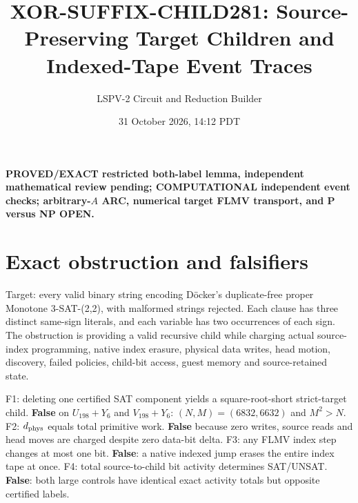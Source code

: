 \documentclass[11pt]{article}
\title{XOR-SUFFIX-CHILD281: Source-Preserving Target Children and Indexed-Tape Event Traces}
\author{LSPV-2 Circuit and Reduction Builder}
\date{31 October 2026, 14:12 PDT}
\begin{document}
\maketitle
\noindent\textbf{PROVED/EXACT restricted both-label lemma, independent mathematical review pending; COMPUTATIONAL independent event checks; arbitrary-$A$ ARC, numerical target FLMV transport, and P versus NP OPEN.}

\section{Exact obstruction and falsifiers}
Target: every valid binary string encoding D\"ocker's duplicate-free proper Monotone 3-SAT-(2,2), with malformed strings rejected. Each clause has three distinct same-sign literals, and each variable has two occurrences of each sign. The obstruction is providing a valid recursive child while charging actual source-index programming, native index erasure, physical data writes, head motion, discovery, failed policies, child-bit access, guest memory and source-retained state.

F1: deleting one certified SAT component yields a square-root-short strict-target child. \textbf{False} on $U_{198}+Y_6$ and $V_{198}+Y_6$: $(N,M)=(6832,6632)$ and $M^2>N$. F2: $d_{\rm phys}$ equals total primitive work. \textbf{False} because zero writes, source reads and head moves are charged despite zero data-bit delta. F3: any FLMV index step changes at most one bit. \textbf{False}: a native indexed jump erases the entire index tape at once. F4: total source-to-child bit activity determines SAT/UNSAT. \textbf{False}: both large controls have identical exact activity totals but opposite certified labels.
\end{document}
